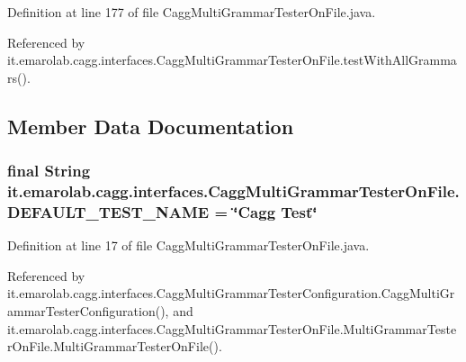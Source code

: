 Definition at line 177 of file Cagg\-Multi\-Grammar\-Tester\-On\-File.\-java.



Referenced by it.\-emarolab.\-cagg.\-interfaces.\-Cagg\-Multi\-Grammar\-Tester\-On\-File.\-test\-With\-All\-Grammars().



\subsection{Member Data Documentation}
\hypertarget{classit_1_1emarolab_1_1cagg_1_1interfaces_1_1CaggMultiGrammarTesterOnFile_abdbd06b0fcc54d30e426181e20ed181b}{
\subsubsection[{D\-E\-F\-A\-U\-L\-T\-\_\-\-T\-E\-S\-T\-\_\-\-N\-A\-M\-E}]{\setlength{\rightskip}{0pt plus 5cm}final String it.\-emarolab.\-cagg.\-interfaces.\-Cagg\-Multi\-Grammar\-Tester\-On\-File.\-D\-E\-F\-A\-U\-L\-T\-\_\-\-T\-E\-S\-T\-\_\-\-N\-A\-M\-E = \char`\"{}Cagg Test\char`\"{}\hspace{0.3cm}{\ttfamily [static]}}}\label{classit_1_1emarolab_1_1cagg_1_1interfaces_1_1CaggMultiGrammarTesterOnFile_abdbd06b0fcc54d30e426181e20ed181b}


Definition at line 17 of file Cagg\-Multi\-Grammar\-Tester\-On\-File.\-java.



Referenced by it.\-emarolab.\-cagg.\-interfaces.\-Cagg\-Multi\-Grammar\-Tester\-Configuration.\-Cagg\-Multi\-Grammar\-Tester\-Configuration(), and it.\-emarolab.\-cagg.\-interfaces.\-Cagg\-Multi\-Grammar\-Tester\-On\-File.\-Multi\-Grammar\-Tester\-On\-File.\-Multi\-Grammar\-Tester\-On\-File().

